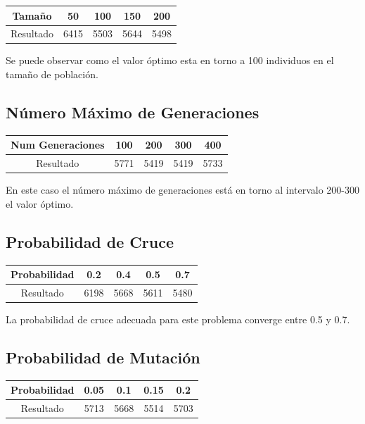 \documentclass[12pt]{article}
\begin{document}
\begin{table}[H]
\begin{center}
\begin{tabular}{|ccccc|} \hline
Tamaño	   & 50 & 100 & 150 & 200 \\  \hline
Resultado  &  6415 & 5503 & 5644 & 5498 \\ \hline
\end{tabular}
\end{center}
\end{table}

	Se puede observar como el valor óptimo esta en torno a 100 individuos en el tamaño de población. 

\subsection{Número Máximo de Generaciones}
\begin{table}[H]
\begin{center}
\begin{tabular}{|ccccc|} \hline
Num Generaciones  & 100 & 200 & 300 & 400 \\  \hline
Resultado  &  5771 & 5419 & 5419 & 5733 \\ \hline
\end{tabular}
\end{center}
\end{table}	

	En este caso el número máximo de generaciones está en torno al intervalo 200-300 el valor óptimo.

\subsection{Probabilidad de Cruce}
\begin{table}[H]
\begin{center}
\begin{tabular}{|ccccc|} \hline
Probabilidad   & 0.2 & 0.4 & 0.5 & 0.7 \\  \hline
Resultado  &  6198 & 5668 & 5611 & 5480 \\ \hline
\end{tabular}
\end{center}
\end{table}

	La probabilidad de cruce adecuada para este problema converge entre 0.5 y 0.7.

\subsection{Probabilidad de Mutación}
\begin{table}[H]
\begin{center}
\begin{tabular}{|ccccc|} \hline
Probabilidad   & 0.05 & 0.1 & 0.15 & 0.2 \\  \hline
Resultado  &  5713 & 5668 & 5514 & 5703 \\ \hline
\end{tabular}
\end{center}
\end{table}
\end{document}
